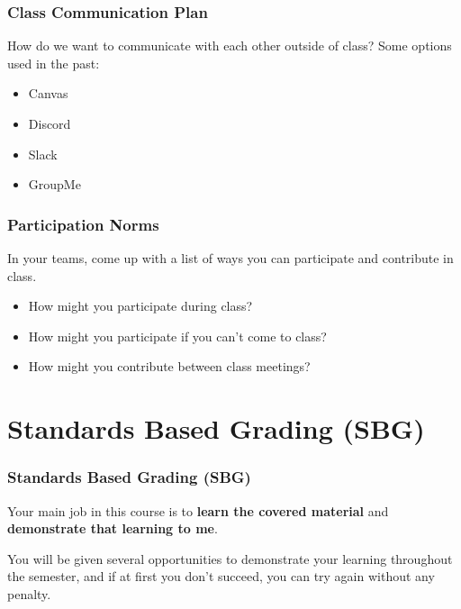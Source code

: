 \documentclass[aspectratio=1610]{beamer}
\begin{document}
\begin{frame}\frametitle{Class Communication Plan}

How do we want to communicate with each other outside of class?
\vfill
Some options used in the past:
\begin{itemize}
\item Canvas 
\item Discord
\item Slack
\item GroupMe
\end{itemize}

\end{frame}


\begin{frame}\frametitle{Participation Norms}

In your teams, come up with a list of ways you can participate and contribute in class.
\vfill
\begin{itemize}
\item How might you participate during class?
\item How might you participate if you can't come to class? 
\item How might you contribute between class meetings?
\end{itemize}
\end{frame}

\section{Standards Based Grading (SBG)}
%
%



\begin{frame}\frametitle{Standards Based Grading (SBG)}
Your main job in this course is to \textbf{learn the covered material}
and \textbf{demonstrate that learning to me}.

\vspace{0.2in}
\pause

You will be given several opportunities to demonstrate your learning throughout
the semester, and if
at first you don't succeed, you can try again without any penalty.
\end{frame}
\end{document}
